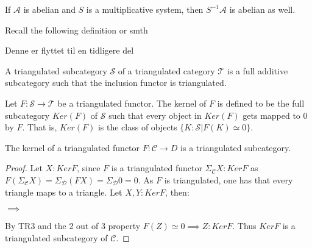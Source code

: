     \begin{corollary}
        If $\mathcal{A}$ is abelian and $S$ is a multiplicative system, then $S^{-1}\mathcal{A}$ is abelian as well.
    \end{corollary}


    Recall the following definition or smth

    \begin{definition}
        Denne er flyttet til en tidligere del
    \end{definition}

    \begin{definition}
        A triangulated subcategory $\mathcal{S}$ of a triangulated category $\mathcal{T}$ is a full additive subcategory such that the inclusion functor is triangulated.
    \end{definition}

    \begin{definition}
        Let $F : \mathcal{S} \rightarrow \mathcal{T}$ be a triangulated functor. The kernel of $F$ is defined to be the full subcategory $Ker(F)$ of $\mathcal{S}$ such that every object in $Ker(F)$ gets mapped to $0$ by $F$. That is, $Ker(F)$ is the class of objects $\{K : \mathcal{S} | F(K)\simeq 0\}$.
    \end{definition}

    \begin{lemma}
        The kernel of a triangulated functor $F:\mathcal{C}\rightarrow{D}$ is a triangulated subcategory.
    \end{lemma}

    \begin{proof}
        Let $X:KerF$, since $F$ is a triangulated functor $\Sigma_{\mathcal{C}}X:KerF$ as $F(\Sigma_{\mathcal{C}}X)=\Sigma_{\mathcal{D}}(FX)=\Sigma_{\mathcal{D}}0=0$. As $F$ is triangulated, one has that every triangle maps to a triangle. Let $X,Y:KerF$, then:
        \begin{center}
            $\implies$
        \end{center}
        By TR3 and the 2 out of 3 property $F(Z)\simeq 0 \implies Z:KerF$. Thus $KerF$ is a triangulated subcategory of $\mathcal{C}$.
    \end{proof}

